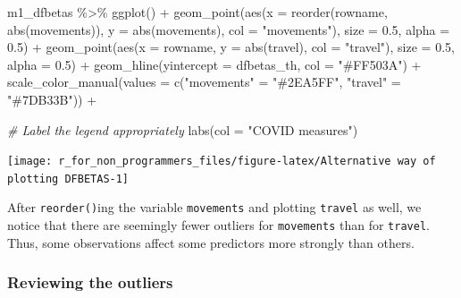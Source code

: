 \documentclass[
]{book}
\newenvironment{Shaded}{\begin{snugshade}}{\end{snugshade}}
\newcommand{\AttributeTok}[1]{\textcolor[rgb]{0.77,0.63,0.00}{#1}}
\newcommand{\CommentTok}[1]{\textcolor[rgb]{0.56,0.35,0.01}{\textit{#1}}}
\newcommand{\FloatTok}[1]{\textcolor[rgb]{0.00,0.00,0.81}{#1}}
\newcommand{\FunctionTok}[1]{\textcolor[rgb]{0.00,0.00,0.00}{#1}}
\newcommand{\NormalTok}[1]{#1}
\newcommand{\OtherTok}[1]{\textcolor[rgb]{0.56,0.35,0.01}{#1}}
\newcommand{\SpecialCharTok}[1]{\textcolor[rgb]{0.00,0.00,0.00}{#1}}
\newcommand{\StringTok}[1]{\textcolor[rgb]{0.31,0.60,0.02}{#1}}
\begin{document}
\begin{Shaded}
\begin{Highlighting}[]
\NormalTok{m1\_dfbetas }\SpecialCharTok{\%\textgreater{}\%}
  \FunctionTok{ggplot}\NormalTok{() }\SpecialCharTok{+}
  \FunctionTok{geom\_point}\NormalTok{(}\FunctionTok{aes}\NormalTok{(}\AttributeTok{x =} \FunctionTok{reorder}\NormalTok{(rowname, }\FunctionTok{abs}\NormalTok{(movements)),}
                 \AttributeTok{y =} \FunctionTok{abs}\NormalTok{(movements),}
                 \AttributeTok{col =} \StringTok{"movements"}\NormalTok{),}
             \AttributeTok{size =} \FloatTok{0.5}\NormalTok{,}
             \AttributeTok{alpha =} \FloatTok{0.5}\NormalTok{) }\SpecialCharTok{+}
  \FunctionTok{geom\_point}\NormalTok{(}\FunctionTok{aes}\NormalTok{(}\AttributeTok{x =}\NormalTok{ rowname,}
                 \AttributeTok{y =} \FunctionTok{abs}\NormalTok{(travel),}
                 \AttributeTok{col =} \StringTok{"travel"}\NormalTok{),}
             \AttributeTok{size =} \FloatTok{0.5}\NormalTok{,}
             \AttributeTok{alpha =} \FloatTok{0.5}\NormalTok{) }\SpecialCharTok{+}
  \FunctionTok{geom\_hline}\NormalTok{(}\AttributeTok{yintercept =}\NormalTok{ dfbetas\_th, }\AttributeTok{col =} \StringTok{"\#FF503A"}\NormalTok{) }\SpecialCharTok{+}
  \FunctionTok{scale\_color\_manual}\NormalTok{(}\AttributeTok{values =} \FunctionTok{c}\NormalTok{(}\StringTok{"movements"} \OtherTok{=} \StringTok{"\#2EA5FF"}\NormalTok{,}
                                \StringTok{"travel"} \OtherTok{=} \StringTok{"\#7DB33B"}\NormalTok{)) }\SpecialCharTok{+}

  \CommentTok{\# Label the legend appropriately}
  \FunctionTok{labs}\NormalTok{(}\AttributeTok{col =} \StringTok{"COVID measures"}\NormalTok{)}
\end{Highlighting}
\end{Shaded}

\begin{center}\texttt{[image: r\_for\_non\_programmers\_files/figure-latex/Alternative way of plotting DFBETAS-1]} \end{center}

After \texttt{reorder()}ing the variable \texttt{movements} and plotting \texttt{travel} as well, we notice that there are seemingly fewer outliers for \texttt{movements} than for \texttt{travel}. Thus, some observations affect some predictors more strongly than others.

\hypertarget{reviewing-the-outliers}{%
\subsubsection{Reviewing the outliers}\label{reviewing-the-outliers}}
\end{document}
